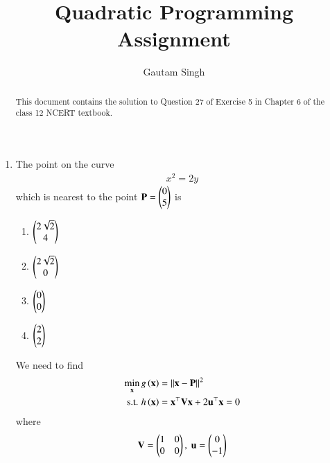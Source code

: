 \documentclass[journal,12pt,twocolumn]{IEEEtran}
\renewcommand{\vec}[1]{\boldsymbol{\mathbf{#1}}}
\begin{document}
\vspace{3cm}
\title{Quadratic Programming Assignment}
\author{Gautam Singh}
\maketitle
\bigskip

\begin{abstract}
    This document contains the solution to Question 27 of Exercise 5 in Chapter
    6 of the class 12 NCERT textbook.
\end{abstract}

\begin{enumerate}
    \item The point on the curve 
    \begin{align}
        x^2 = 2y
        \label{eq:curve}
    \end{align}
    which is nearest to the point 
    $\vec{P} = \myvec{0\\5}$ is
    \begin{enumerate}
        \item $\begin{pmatrix}2\sqrt{2}\\4\end{pmatrix}$
        \item $\begin{pmatrix}2\sqrt{2}\\0\end{pmatrix}$
        \item $\begin{pmatrix}0\\0\end{pmatrix}$
        \item $\begin{pmatrix}2\\2\end{pmatrix}$
    \end{enumerate}

    \solution We need to find
    \begin{align}
        \min_{\vec{x}} g\brak{\vec{x}} &= \norm{\vec{x}-\vec{P}}^2 \label{eq:cost} \\
        \textrm{s.t. } h\brak{\vec{x}} &= \vec{x}^\top\vec{Vx} + 2\vec{u}^\top\vec{x} = 0 \label{eq:constr}
    \end{align}
    where
    \begin{align}
        \vec{V} = \myvec{1&0\\0&0},\ \vec{u} = \myvec{0\\-1}
    \end{align}


\end{enumerate}
\end{document}
